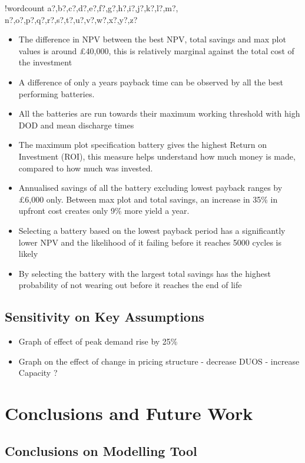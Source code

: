\documentclass[fontsize=9.5pt]{extarticle}
\numberwithin{figure}{section} %
\providecommand{\tightlist}{%
  \setlength{\itemsep}{0pt}\setlength{\parskip}{0pt}}
\newcounter{words}
\newenvironment{counted}{%
  \setcounter{words}{0}
  \SearchList!{wordcount}{\stepcounter{words}}
    {a?,b?,c?,d?,e?,f?,g?,h?,i?,j?,k?,l?,m?,
    n?,o?,p?,q?,r?,s?,t?,u?,v?,w?,x?,y?,z?}
  \UndoBoundary{'}
  \SearchOrder{p;}}{%
  \StopSearching}
\begin{document}
\begin{counted}
\begin{itemize}
\tightlist
\item
  The difference in NPV between the best NPV, total savings and max plot
  values is around £40,000, this is relatively marginal against the
  total cost of the investment
\item
  A difference of only a years payback time can be observed by all the
  best performing batteries.
\item
  All the batteries are run towards their maximum working threshold with
  high DOD and mean discharge times
\item
  The maximum plot specification battery gives the highest Return on
  Investment (ROI), this measure helps understand how much money is
  made, compared to how much was invested.
\item
  Annualised savings of all the battery excluding lowest payback ranges
  by £6,000 only. Between max plot and total savings, an increase in
  35\% in upfront cost creates only 9\% more yield a year.
\item
  Selecting a battery based on the lowest payback period has a
  significantly lower NPV and the likelihood of it failing before it
  reaches 5000 cycles is likely
\item
  By selecting the battery with the largest total savings has the
  highest probability of not wearing out before it reaches the end of
  life
\end{itemize}

\subsection{Sensitivity on Key
Assumptions}\label{sensitivity-on-key-assumptions}

\begin{itemize}
\tightlist
\item
  Graph of effect of peak demand rise by 25\%
\item
  Graph on the effect of change in pricing structure - decrease DUOS -
  increase Capacity ?
\end{itemize}

\section{Conclusions and Future Work}\label{conclusions-and-future-work}

\subsection{Conclusions on Modelling
Tool}\label{conclusions-on-modelling-tool}


\end{counted}
\end{document}
